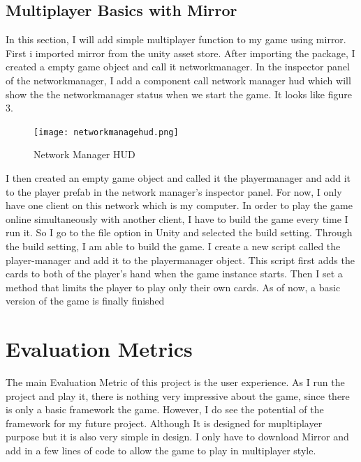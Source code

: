\documentclass[10pt,twocolumn]{article}
\begin{document}
\subsection{Multiplayer Basics with Mirror}
In this section, I will add simple multiplayer function to my game using mirror. First i imported mirror from the unity asset store. After importing the package, I created a empty game object and call it networkmanager.  In the inspector panel of the networkmanager, I add a component call network manager hud which will show the the networkmanager status when we start the game. It looks like figure 3. 

\begin{figure}[ht]
  \texttt{[image: networkmanagehud.png]}
  \caption{Network Manager HUD}
  \label{fig:HUD}
\end{figure}

I then created an empty game object and called it the playermanager and add it to the player prefab in the network manager’s inspector panel. For now, I only have one client on this network which is my computer.  In order to play the game online simultaneously with another client, I have to build the game every time I run it. So I go to the file option in Unity and selected the build setting.  Through the build setting, I am able to build the game. 
	I create a new script called the player-manager and add it to the playermanager object. This script first adds the cards to both of the player’s hand when the game instance starts. Then I set a method that limits the player to play only their own cards. 
As of now, a basic version of the game is finally finished
\section{Evaluation Metrics}
The main Evaluation Metric of this project is the user experience. As I run the project and play it, there is nothing very impressive about the game, since there is only a basic framework the game. However, I do see the potential of the framework for my future project. Although It is designed for mupltiplayer purpose but it is also very simple in design. I only have to download Mirror and add in a few lines of code to allow the game to play in multiplayer style.
\end{document}
